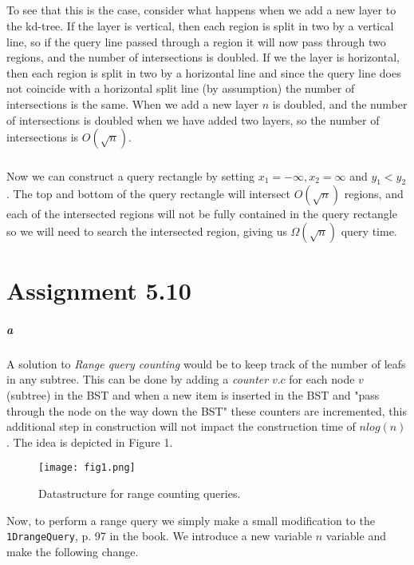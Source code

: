 \documentclass[10pt,a4paper,final,oneside,openany,article]{memoir}
\begin{document}
\paragraph{}
To see that this is the case, consider what happens when we add a new layer to the kd-tree. If the layer is vertical, then each region is split in two by a vertical line, so if the query line passed through a region it will now pass through two regions, and the number of intersections is doubled. If we the layer is horizontal, then each region is split in two by a horizontal line and since the query line does not coincide with a horizontal split line (by assumption) the number of intersections is the same. When we add a new layer $n$ is doubled, and the number of intersections is doubled when we have added two layers, so the number of intersections is $O(\sqrt{n})$.

\paragraph{}
Now we can construct a query rectangle by setting $x_1 = -\infty, x_2 = \infty$ and $y_1 < y_2$. The top and bottom of the query rectangle will intersect $O(\sqrt{n})$ regions, and each of the intersected regions will not be fully contained in the query rectangle so we will need to search the intersected region, giving us $\Omega(\sqrt{n})$ query time.



\chapter*{Assignment 5.10}

\paragraph{a} A solution to \emph{Range query counting} would be to keep
track of the number of leafs in any subtree. This can be done by adding a
\emph{counter} $v.c$ for each node $v$ (subtree) in the BST and when a new item is
inserted in the BST and "pass through the node on the way down the BST" these
counters are incremented, this additional step in construction will not impact
the construction time of $nlog(n)$. The idea is depicted in Figure 1. 
\begin{figure}[htbp]
    \centering
    \texttt{[image: fig1.png]}
    \caption{Datastructure for range counting queries.}
    \label{fig:1}
\end{figure}
Now, to perform a range query we simply make a small modification to the
\texttt{1DrangeQuery}, p. 97 in the book. We introduce a new variable $n$
variable and make the following change. 
\end{document}
